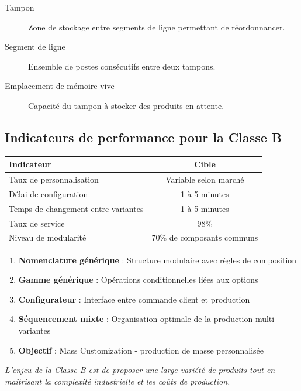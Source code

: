 \documentclass{article}
\begin{document}
\begin{description}
    \item[Tampon] Zone de stockage entre segments de ligne permettant de réordonnancer.
    \item[Segment de ligne] Ensemble de postes consécutifs entre deux tampons.
    \item[Emplacement de mémoire vive] Capacité du tampon à stocker des produits en attente.
\end{description}

\subsection{Indicateurs de performance pour la Classe B}

\begin{table}[h]
\centering
\begin{tabular}{|l|c|}
\hline
\textbf{Indicateur} & \textbf{Cible} \\
\hline
Taux de personnalisation & Variable selon marché \\
Délai de configuration & 1 à 5 minutes \\
Temps de changement entre variantes & 1 à 5 minutes \\
Taux de service & 98\% \\
Niveau de modularité & 70\% de composants communs \\
\hline
\end{tabular}
\end{table}

\begin{tcolorbox}[colback=blueclair, colframe=blue!70!black, title=Synthèse : Classe B]
\begin{enumerate}
    \item \textbf{Nomenclature générique} : Structure modulaire avec règles de composition
    \item \textbf{Gamme générique} : Opérations conditionnelles liées aux options
    \item \textbf{Configurateur} : Interface entre commande client et production
    \item \textbf{Séquencement mixte} : Organisation optimale de la production multi-variantes
    \item \textbf{Objectif} : Mass Customization - production de masse personnalisée
\end{enumerate}
\vspace{0.5em}
\textit{L'enjeu de la Classe B est de proposer une large variété de produits tout en maîtrisant la complexité industrielle et les coûts de production.}
\end{tcolorbox}
\end{document}
